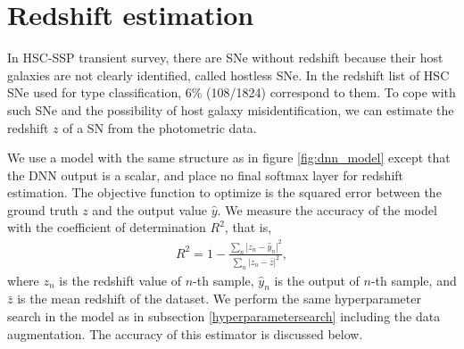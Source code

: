 \documentclass[useamsfonts]{pasj01}
\begin{document}
\section*{Redshift estimation}
\label{sec:est_redshift}
In HSC-SSP transient survey, there are SNe without redshift because their host galaxies are not clearly identified, called hostless SNe.
In the redshift list of HSC SNe used for type classification, 6\% (108/1824) correspond to them.
To cope with such SNe and the possibility of host galaxy misidentification,
we can estimate the redshift $z$ of a SN from the photometric data.

We use a model with the same structure as in figure \ref{fig:dnn_model} except that the DNN output is a scalar, and place no final softmax layer for redshift estimation.
The objective function to optimize is the squared error between the ground truth $z$ and the output value $\hat{y}$.
We measure the accuracy of the model with the coefficient of determination $R^2$, that is,
\begin{eqnarray*}
    R^2 = 1 - \frac{\sum_n \left| z_n - \hat{y}_n \right|^2}{\sum_n \left| z_n - \bar{z} \right|^2}, 
\end{eqnarray*}
where $z_n$ is the redshift value of $n$-th sample, $\hat{y}_n$ is the output of $n$-th sample, 
and $\bar{z}$ is the mean redshift of the dataset.
We perform the same hyperparameter search in the model as in subsection \ref{hyperparametersearch} 
including the data augmentation.
The accuracy of this estimator is discussed below.
\end{document}

